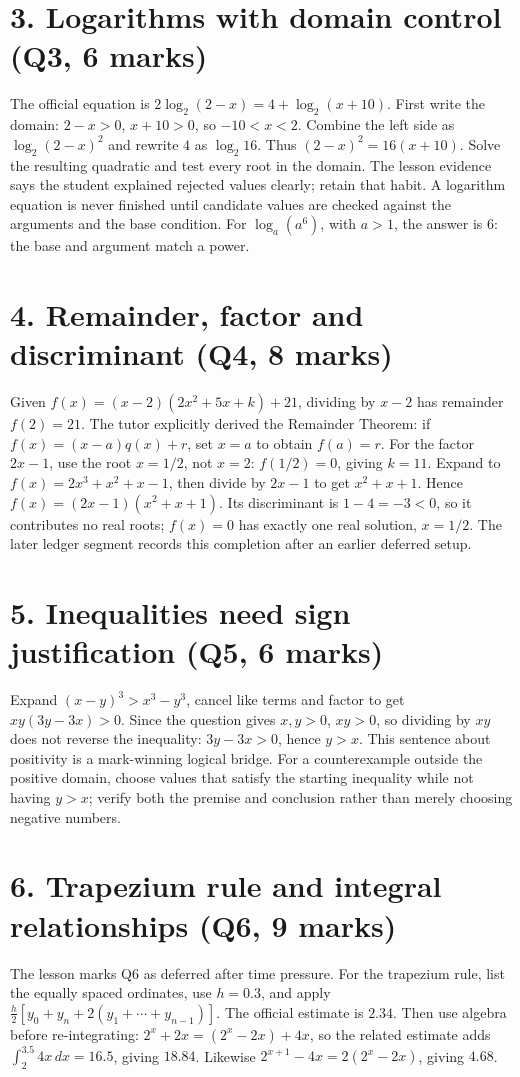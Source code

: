\documentclass[10pt,a4paper]{article}
\begin{document}
\section*{3. Logarithms with domain control (Q3, 6 marks)}
The official equation is $2\log_2(2-x)=4+\log_2(x+10)$. First write the domain: $2-x>0$, $x+10>0$, so $-10<x<2$. Combine the left side as $\log_2(2-x)^2$ and rewrite $4$ as $\log_2 16$. Thus $(2-x)^2=16(x+10)$. Solve the resulting quadratic and test every root in the domain. The lesson evidence says the student explained rejected values clearly; retain that habit. A logarithm equation is never finished until candidate values are checked against the arguments and the base condition. For $\log_a(a^6)$, with $a>1$, the answer is $6$: the base and argument match a power.\section*{4. Remainder, factor and discriminant (Q4, 8 marks)}
Given $f(x)=(x-2)(2x^2+5x+k)+21$, dividing by $x-2$ has remainder $f(2)=21$. The tutor explicitly derived the Remainder Theorem: if $f(x)=(x-a)q(x)+r$, set $x=a$ to obtain $f(a)=r$. For the factor $2x-1$, use the root $x=1/2$, not $x=2$: $f(1/2)=0$, giving $k=11$. Expand to $f(x)=2x^3+x^2+x-1$, then divide by $2x-1$ to get $x^2+x+1$. Hence $f(x)=(2x-1)(x^2+x+1)$. Its discriminant is $1-4=-3<0$, so it contributes no real roots; $f(x)=0$ has exactly one real solution, $x=1/2$. The later ledger segment records this completion after an earlier deferred setup.\newpage
\section*{5. Inequalities need sign justification (Q5, 6 marks)}
Expand $(x-y)^3>x^3-y^3$, cancel like terms and factor to get $xy(3y-3x)>0$. Since the question gives $x,y>0$, $xy>0$, so dividing by $xy$ does not reverse the inequality: $3y-3x>0$, hence $y>x$. This sentence about positivity is a mark-winning logical bridge. For a counterexample outside the positive domain, choose values that satisfy the starting inequality while not having $y>x$; verify both the premise and conclusion rather than merely choosing negative numbers.\section*{6. Trapezium rule and integral relationships (Q6, 9 marks)}
The lesson marks Q6 as deferred after time pressure. For the trapezium rule, list the equally spaced ordinates, use $h=0.3$, and apply $\frac h2[y_0+y_n+2(y_1+\cdots+y_{n-1})]$. The official estimate is $2.34$. Then use algebra before re-integrating: $2^x+2x=(2^x-2x)+4x$, so the related estimate adds $\int_2^{3.5}4x\,dx=16.5$, giving $18.84$. Likewise $2^{x+1}-4x=2(2^x-2x)$, giving $4.68$.\newpage
\end{document}
